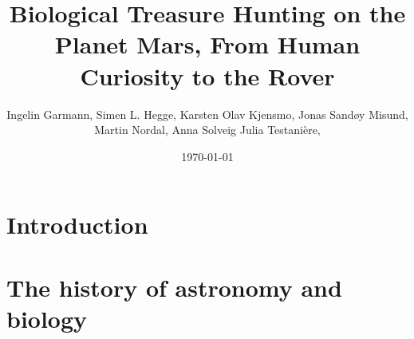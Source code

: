 \documentclass[DIV=calc, paper=a4, fontsize=12pt]{scrartcl}	 %
\title{Biological Treasure Hunting on the Planet Mars,
From Human Curiosity to the Rover} %
\author{Ingelin Garmann, Simen L. Hegge, Karsten Olav Kjensmo, Jonas Sandøy Misund, Martin Nordal, Anna Solveig Julia Testani\`{e}re, } %
\date{\today} %
\begin{document}
\maketitle %

\thispagestyle{fancy} %





\pagebreak
\tableofcontents


\pagebreak
\section{Introduction}

\begin{multicols}{2}



\end{multicols}

\noindent\makebox[\linewidth]{\rule{\textwidth}{0.4pt}}


\section{The history of astronomy and biology}

\begin{multicols}{2}



\vspace{5mm}



\end{multicols}
\end{document}
